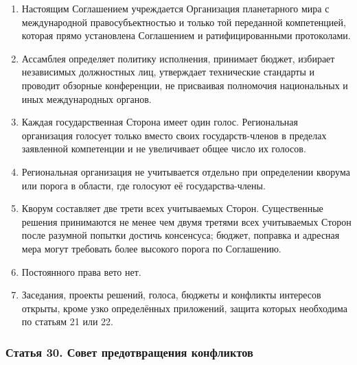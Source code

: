 \documentclass[
  russian,
  11pt,
  a4paper,
]{article}
\providecommand{\tightlist}{%
  \setlength{\itemsep}{0pt}\setlength{\parskip}{0pt}}
\begin{document}
\begin{enumerate}
\def\labelenumi{\arabic{enumi}.}
\tightlist
\item
  Настоящим Соглашением учреждается Организация планетарного мира с
  международной правосубъектностью и только той переданной компетенцией,
  которая прямо установлена Соглашением и ратифицированными протоколами.
\item
  Ассамблея определяет политику исполнения, принимает бюджет, избирает
  независимых должностных лиц, утверждает технические стандарты и
  проводит обзорные конференции, не присваивая полномочия национальных и
  иных международных органов.
\item
  Каждая государственная Сторона имеет один голос. Региональная
  организация голосует только вместо своих государств-членов в пределах
  заявленной компетенции и не увеличивает общее число их голосов.
\item
  Региональная организация не учитывается отдельно при определении
  кворума или порога в области, где голосуют её государства-члены.
\item
  Кворум составляет две трети всех учитываемых Сторон. Существенные
  решения принимаются не менее чем двумя третями всех учитываемых Сторон
  после разумной попытки достичь консенсуса; бюджет, поправка и адресная
  мера могут требовать более высокого порога по Соглашению.
\item
  Постоянного права вето нет.
\item
  Заседания, проекты решений, голоса, бюджеты и конфликты интересов
  открыты, кроме узко определённых приложений, защита которых необходима
  по статьям 21 или 22.
\end{enumerate}

\subsubsection{Статья 30. Совет предотвращения
конфликтов}\label{ux441ux442ux430ux442ux44cux44f-30-ux441ux43eux432ux435ux442-ux43fux440ux435ux434ux43eux442ux432ux440ux430ux449ux435ux43dux438ux44f-ux43aux43eux43dux444ux43bux438ux43aux442ux43eux432}
\end{document}
